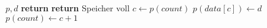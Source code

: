 \begin{algorithm}[!ht]
\caption{}
\label{alg:distancepool-adddistance}
\begin{algorithmic}[1]
	\Require $p,d$
		\State \textbf{return}
	\EndIf
		\State \textbf{return} \Comment Speicher voll
	\EndIf
	\State $c \gets p(\mathit{count})$
	\State $p(\mathit{data}[c]) \gets d$
	\State $p(\mathit{count}) \gets c + 1$
\end{algorithmic}
\end{algorithm}
